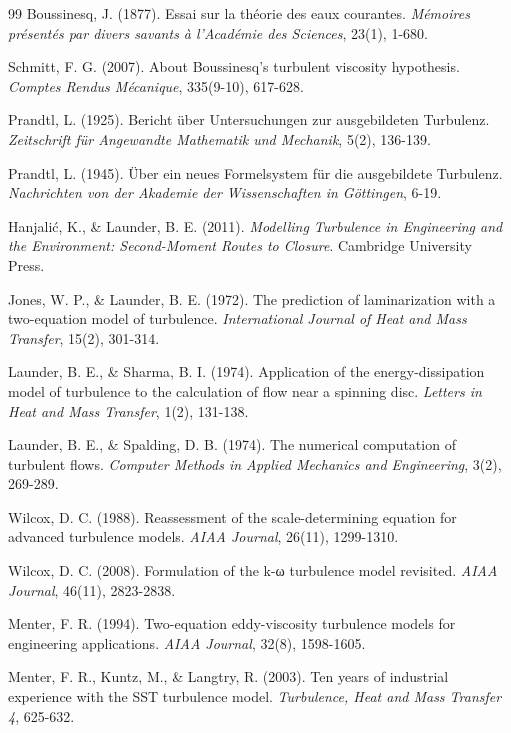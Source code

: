 \begin{thebibliography}{99}
Boussinesq, J. (1877). Essai sur la théorie des eaux courantes. \emph{Mémoires présentés par divers savants à l'Académie des Sciences}, 23(1), 1-680.

Schmitt, F. G. (2007). About Boussinesq's turbulent viscosity hypothesis. \emph{Comptes Rendus Mécanique}, 335(9-10), 617-628.

Prandtl, L. (1925). Bericht über Untersuchungen zur ausgebildeten Turbulenz. \emph{Zeitschrift für Angewandte Mathematik und Mechanik}, 5(2), 136-139.

Prandtl, L. (1945). Über ein neues Formelsystem für die ausgebildete Turbulenz. \emph{Nachrichten von der Akademie der Wissenschaften in Göttingen}, 6-19.

Hanjalić, K., \& Launder, B. E. (2011). \emph{Modelling Turbulence in Engineering and the Environment: Second-Moment Routes to Closure}. Cambridge University Press.

Jones, W. P., \& Launder, B. E. (1972). The prediction of laminarization with a two-equation model of turbulence. \emph{International Journal of Heat and Mass Transfer}, 15(2), 301-314.

Launder, B. E., \& Sharma, B. I. (1974). Application of the energy-dissipation model of turbulence to the calculation of flow near a spinning disc. \emph{Letters in Heat and Mass Transfer}, 1(2), 131-138.

Launder, B. E., \& Spalding, D. B. (1974). The numerical computation of turbulent flows. \emph{Computer Methods in Applied Mechanics and Engineering}, 3(2), 269-289.

Wilcox, D. C. (1988). Reassessment of the scale-determining equation for advanced turbulence models. \emph{AIAA Journal}, 26(11), 1299-1310.

Wilcox, D. C. (2008). Formulation of the k-ω turbulence model revisited. \emph{AIAA Journal}, 46(11), 2823-2838.

Menter, F. R. (1994). Two-equation eddy-viscosity turbulence models for engineering applications. \emph{AIAA Journal}, 32(8), 1598-1605.

Menter, F. R., Kuntz, M., \& Langtry, R. (2003). Ten years of industrial experience with the SST turbulence model. \emph{Turbulence, Heat and Mass Transfer 4}, 625-632.


\end{thebibliography}
